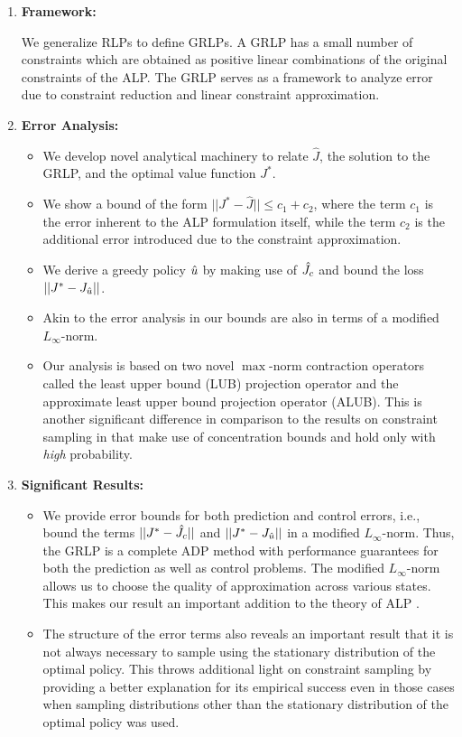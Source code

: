 \begin{enumerate}
\item \textbf{Framework:}

We generalize RLPs to define GRLPs. A GRLP has a small number of constraints which are obtained as positive linear combinations of the original constraints of the ALP. 
The GRLP serves as a framework to analyze error due to constraint reduction and linear constraint approximation.
\item \textbf{Error Analysis:}
	\begin{itemize}
		\item We develop novel analytical machinery to relate $\hat{J}$, the solution to the GRLP, and the optimal value function $J^*$. 
		\item We show a bound of the form $||J^*-\hat{J}||\leq c_1+c_2$, 
		where the term $c_1$ is the error inherent to the ALP formulation itself, 
		while the term $c_2$ is the additional error introduced due to the constraint approximation.  
		\item We derive a greedy policy $\hat{u}$ by making use of $\hat{J}_c$ and bound the loss $||J^*-J_{\hat{u}}||$. 
		\item Akin to the error analysis in \cite{ALP,CS,SALP} our bounds are also in terms of a modified $L_\infty$-norm.
		\item Our analysis is based on two novel $\max$-norm contraction operators called the least upper bound (LUB) projection operator and the approximate least upper bound projection operator (ALUB). This is another significant difference in comparison to the results on constraint sampling in \cite{SALP,CS} that make use of concentration bounds and hold only with \emph{high} probability.
\end{itemize}
\item \textbf{Significant Results:}
	\begin{itemize}
		\item We provide error bounds for both prediction and control errors, i.e., bound the terms $||J^*-\hat{J}_c||$ and $||J^*-J_{\hat{u}}||$ in a modified $L_\infty$-norm. Thus, the GRLP is a complete ADP method with performance guarantees for both the prediction as well as control problems. The modified $L_\infty$-norm allows us to choose the quality of approximation across various states. This makes our result an important addition to the theory of ALP \cite{ALP,CS,CST,SALP}.
		\item The structure of the error terms also reveals an important result that it is not always necessary to sample using the stationary distribution of the optimal policy. This throws additional light on constraint sampling by providing a better explanation for its empirical success even in those cases when sampling distributions other than the stationary distribution of the optimal policy was used. 

\end{itemize}
\end{enumerate}
